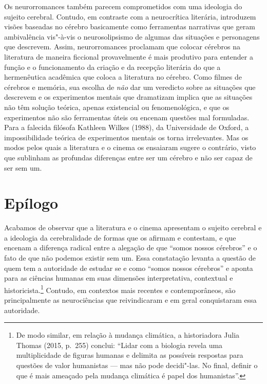 Os neurorromances também parecem comprometidos com uma ideologia do
sujeito cerebral. Contudo, em contraste com a neurocrítica literária,
introduzem visões baseadas no cérebro basicamente como ferramentas
narrativas que geram ambivalência vis"-à-vis o neurosolipsismo de algumas
das situações e personagens que descrevem. Assim, neurorromances
proclamam que colocar cérebros na literatura de maneira ficcional
provavelmente é mais produtivo para entender a função e o funcionamento
da criação e da recepção literária do que a hermenêutica acadêmica que
coloca a literatura no cérebro. Como filmes de cérebros e memória, sua
escolha de \emph{não} dar um veredicto sobre as situações que descrevem
e os experimentos mentais que dramatizam implica que as situações não
têm solução teórica, apenas existencial ou fenomenológica, e que os
experimentos não são ferramentas úteis ou encenam questões mal
formuladas. Para a falecida filósofa Kathleen Wilkes (1988), da Universidade de Oxford, a
impossibilidade teórica de experimentos mentais os torna irrelevantes.
Mas os modos pelos quais a literatura e o cinema os ensaiaram sugere o
contrário, visto que sublinham as profundas diferenças entre ser um
cérebro e não ser capaz de ser sem um.

\chapter{Epílogo}

Acabamos de observar que a literatura e o cinema apresentam o sujeito
cerebral e a ideologia da cerebralidade de formas que os afirmam e
contestam, e que encenam a diferença radical entre a alegação de que
``somos nossos cérebros'' e o fato de que não podemos existir sem um.
Essa constatação levanta a questão de quem tem a autoridade de estudar
se e como ``somos nossos cérebros'' e aponta para as ciências humanas em
suas dimensões interpretativa, contextual e
historicista.\footnote[1]{De modo similar, em relação à mudança climática, a historiadora
Julia Thomas (2015, p.~255) conclui: ``Lidar com a biologia revela uma
multiplicidade de figuras humanas e delimita as possíveis respostas para
questões de valor humanistas --- mas não pode decidi"-las. No final,
definir o que é mais ameaçado pela mudança climática é papel dos
humanistas''.} Contudo, em contextos mais recentes e
contemporâneos, são principalmente as neurociências que reivindicaram e
em geral conquistaram essa autoridade.

